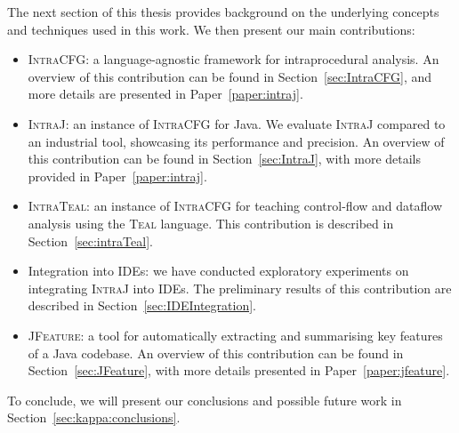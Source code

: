 The next section of this thesis provides background on the
underlying concepts and techniques used in this work. We then present our main contributions:
\begin{itemize}
	\item \textsc{IntraCFG}: a language-agnostic framework for intraprocedural analysis.
	 An overview of this contribution can be found in Section~\ref{sec:IntraCFG}, and more details are presented in Paper~\ref{paper:intraj}.
	\item \textsc{IntraJ}: an instance of \textsc{IntraCFG} for Java.
	We evaluate \textsc{IntraJ} compared to an industrial tool, showcasing its
	performance and precision. An overview of this contribution can be found in Section~\ref{sec:IntraJ},
	with more details provided in Paper~\ref{paper:intraj}.
	\item \textsc{IntraTeal}: an instance of \textsc{IntraCFG} for teaching control-flow and  dataflow analysis using the \textsc{Teal} language.
	This contribution is described in Section~\ref{sec:intraTeal}.
	\item Integration into IDEs: we have conducted exploratory experiments on integrating
	\textsc{IntraJ} into IDEs. The preliminary results of this contribution are described in Section~\ref{sec:IDEIntegration}.
	\item \textsc{JFeature}: a tool for automatically extracting and summarising key
	features of a Java codebase. An overview of this contribution can be found
	in Section~\ref{sec:JFeature}, with more details presented in Paper~\ref{paper:jfeature}.

\end{itemize}

To conclude, we will present our conclusions and possible future work in Section~\ref{sec:kappa:conclusions}.



